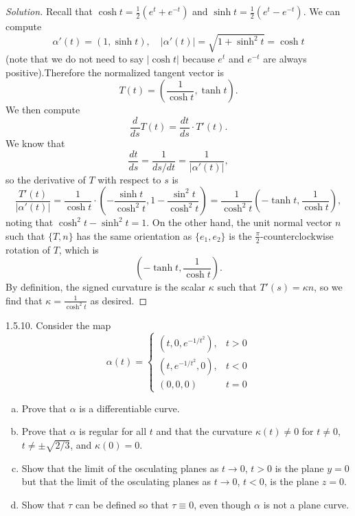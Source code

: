 \documentclass[11pt]{scrartcl}
\providecommand{\half}{\frac{1}{2}}
\providecommand{\ii}{\item}
\newenvironment{soln}{\begin{proof}[Solution]}{\end{proof}}
\begin{document}
\begin{soln}
	Recall that $\cosh t = \half(e^t + e^{-t})$ and
	$\sinh t = \half(e^t - e^{-t})$. We can compute
	\[\alpha'(t) = (1, \sinh t),\quad |\alpha'(t)| = \sqrt{1 + \sinh^2 t}
	= \cosh t\]
	(note that we do not need to say $|\cosh t|$ because $e^t$ and $e^{-t}$
	are always positive).Therefore the normalized tangent vector is
	\[T(t) = \left(\frac{1}{\cosh t}, \tanh t\right).\]
	We then compute
	\[\frac{d}{ds} T(t) = \frac{dt}{ds}\cdot T'(t).\]
	We know that
	\[\frac{dt}{ds} = \frac{1}{ds/dt} = \frac{1}{|\alpha'(t)|},\]
	so the derivative of $T$ with respect to $s$ is
	\[\frac{T'(t)}{|\alpha'(t)|} = \frac{1}{\cosh t}\cdot
	\left(-\frac{\sinh t}{\cosh^2t}, 1-\frac{\sin^2t}{\cosh^2t}\right) =
	\frac{1}{\cosh^2 t}\left(-\tanh t, \frac{1}{\cosh t}\right),\]
	noting that $\cosh^2 t - \sinh^2 t = 1$.
	On the other hand, the unit normal vector $n$ such that
	$\{T, n\}$ has the same orientation as $\{e_1, e_2\}$ is the
	$\frac\pi2$-counterclockwise rotation of $T$, which is
	\[\left(-\tanh t, \frac{1}{\cosh t}\right).\]
	By definition, the signed curvature is the scalar $\kappa$ such that
	$T'(s) = \kappa n$, so we find that $\kappa = \frac{1}{\cosh^2t}$
	as desired.
\end{soln}

\begin{problem*} 1.5.10.
	Consider the map
	\[\alpha(t) = \begin{cases}
		(t, 0, e^{-1/t^2}), & t>0\\
		(t, e^{-1/t^2}, 0), & t<0\\
		(0, 0, 0) & t=0
	\end{cases}\]
	\begin{enumerate}[(a)]
		\ii Prove that $\alpha$ is a differentiable curve.
		\ii Prove that $\alpha$ is regular for all $t$ and that
		the curvature $\kappa(t)\ne 0$ for $t\ne 0$, $t\ne\pm\sqrt{2/3}$,
		and $\kappa(0) = 0$.
		\ii Show that the limit of the osculating planes as $t\to 0$,
		$t > 0$ is the plane $y=0$ but that the limit of
		the osculating planes as $t\to 0$, $t<0$,
		is the plane $z=0$.
		\ii Show that $\tau$ can be defined so that $\tau\equiv 0$,
		even though $\alpha$ is not a plane curve.
	\end{enumerate}
\end{problem*}
\end{document}
